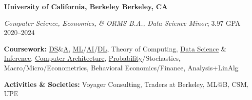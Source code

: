 \textbf{University of California, Berkeley \hfill Berkeley, CA} \par
\textit{Computer Science, Economics, \& ORMS B.A., Data Science Minor}; 3.97 GPA \hfill 2020--2024\par
\textbf{Coursework:} \href{https://sp23.datastructur.es/}{DS}\&\href{https://cs170.org/}{A}, \href{https://www.eecs189.org/}{ML}/\href{https://inst.eecs.berkeley.edu/~cs188/fa22/}{AI}/\href{https://inst.eecs.berkeley.edu/~cs182/sp23/}{DL}, Theory of Computing, \href{https://ds100.org/}{Data Science} \& \href{https://data102.org/fa22/}{Inference}, \href{https://inst.eecs.berkeley.edu/~cs61c/fa22/}{Computer Architecture}, \href{https://www.stat134.org/}{Probability}/Stochastics, Macro/Micro/Econometrics, Behavioral Economics/Finance, Analysis+LinAlg \par
\textbf{Activities \& Societies:} Voyager Consulting, Traders at Berkeley, ML@B, CSM, UPE